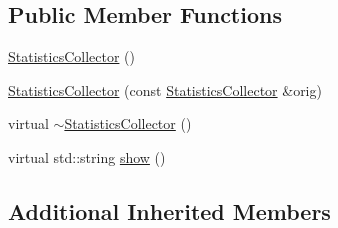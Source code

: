 \subsection*{Public Member Functions}
\begin{DoxyCompactItemize}
\item 
\hyperlink{class_statistics_collector_a2129c2bd19f9d64814fbfe18974a6d2e}{Statistics\-Collector} ()
\item 
\hyperlink{class_statistics_collector_a25e8def6d91decdf48d7c0fedb4382dc}{Statistics\-Collector} (const \hyperlink{class_statistics_collector}{Statistics\-Collector} \&orig)
\item 
virtual \hyperlink{class_statistics_collector_aef9244a0c9f715bc19136d283b759c6e}{$\sim$\-Statistics\-Collector} ()
\item 
virtual std\-::string \hyperlink{class_statistics_collector_a7ce8dad7e29d06c73a01d2ddee93fe00}{show} ()
\end{DoxyCompactItemize}
\subsection*{Additional Inherited Members}


